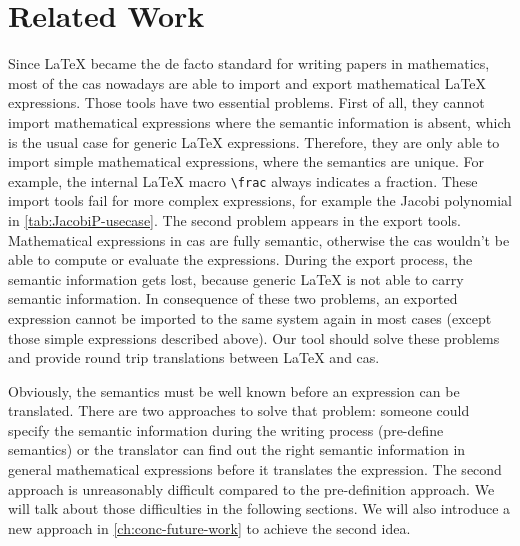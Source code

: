 \section{Related Work}\label{sec:related-work}
Since \LaTeX{} became the de facto standard for writing papers in mathematics, most of the \gls{cas} nowadays are able to import and export mathematical \LaTeX{} expressions. Those tools have two essential problems. First of all, they cannot import mathematical expressions where the semantic information is absent, which is the usual case for generic \LaTeX{} expressions. Therefore, they are only able to import simple mathematical expressions, where the semantics are unique. For example, the internal \LaTeX{} macro \verb|\frac| always indicates a fraction. These import tools fail for more complex expressions, for example the Jacobi polynomial in \cref{tab:JacobiP-usecase}. The second problem appears in the export tools. Mathematical expressions in \gls{cas} are fully semantic, otherwise the \gls{cas} wouldn't be able to compute or evaluate the expressions. During the export process, the semantic information gets lost, because generic \LaTeX{} is not able to carry semantic information. In consequence of these two problems, an exported expression cannot be imported to the same system again in most cases (except those simple expressions described above). Our tool should solve these problems and provide round trip translations between \LaTeX{} and \gls{cas}.

Obviously, the semantics must be well known before an expression can be translated. There are two approaches to solve that problem: someone could specify the semantic information during the writing process (pre-define semantics) or the translator can find out the right semantic information in general mathematical expressions before it translates the expression. The second approach is unreasonably difficult compared to the pre-definition approach. We will talk about those difficulties in the following sections. We will also introduce a new approach in \cref{ch:conc-future-work} to achieve the second idea.

